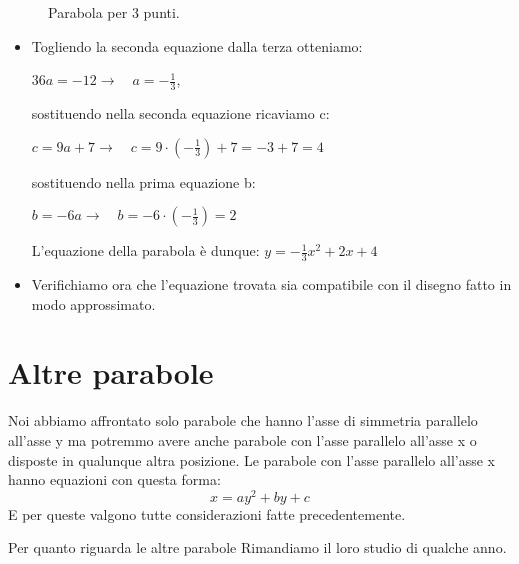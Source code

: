 \begin{exrig}
\begin{esempio}
\begin{figure}[h]
\begin{minipage}{.60\textwidth}
\end{minipage}
\begin{minipage}{.40\textwidth}
\begin{inaccessibleblock}[Parabola di equazione $y=x^2$.]
\centering
  
  \caption{Parabola per 3 punti.} \label{fig:parabola_parabolaverticepunto}
\end{inaccessibleblock}
\end{minipage}
\end{figure}

  \begin{itemize}
  \item Togliendo la seconda equazione dalla terza otteniamo: 

$36a=-12 \rightarrow \quad a=-\frac{1}{3}$, 

sostituendo nella seconda equazione ricaviamo c:

$c= 9a+7 \rightarrow \quad c=9 \cdot \left(- \frac{1}{3} \right) +7=-3+7=4$

sostituendo nella prima equazione b:

$b=-6a \rightarrow \quad b=-6 \cdot \left(- \frac{1}{3} \right)=2$

L'equazione della parabola è dunque: $y=-\frac{1}{3}x^2+2x+4$

  \item Verifichiamo ora che l'equazione trovata sia compatibile con il disegno 
  fatto in modo approssimato.
 \end{itemize}
\end{esempio}

\end{exrig}

\section{Altre parabole}
\label{sec:parabola_altreparabole}

Noi abbiamo affrontato solo parabole che hanno l'asse di simmetria parallelo 
all'asse y ma potremmo avere anche parabole con l'asse parallelo all'asse x
o disposte in qualunque altra posizione.
Le parabole con l'asse parallelo all'asse x hanno equazioni con questa forma:
\[x=ay^2+by+c\]
E per queste valgono tutte considerazioni fatte precedentemente.

Per quanto riguarda le altre parabole Rimandiamo il loro studio di qualche 
anno.
